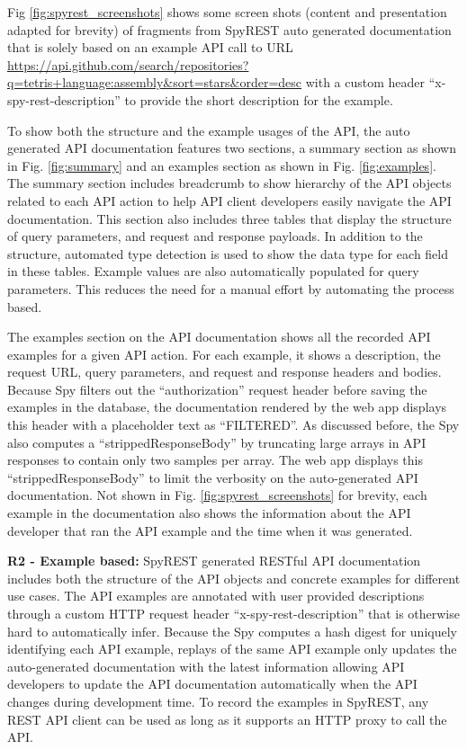 \documentclass[conference]{IEEEtran}
\begin{document}
Fig \ref{fig:spyrest_screenshots} shows some screen shots  (content and presentation adapted for brevity) of fragments from SpyREST auto generated documentation that is solely based on an example API call to URL \url{https://api.github.com/search/repositories?q=tetris+language:assembly&sort=stars&order=desc} with a custom header ``x-spy-rest-description'' to provide the short description for the example.

To show both the structure and the example usages of the API, the auto generated API documentation features two sections, a summary section as shown in Fig. \ref{fig:summary} and an examples section as shown in Fig. \ref{fig:examples}. The summary section includes breadcrumb to show hierarchy of the API objects related to each API action to help API client developers easily navigate the API documentation. This section also includes three tables that display the structure of query parameters, and request and response payloads. In addition to the structure, automated type detection is used to show the data type for each field in these tables. Example values are also automatically populated for query parameters. This reduces the need for a manual effort by automating the process based.

The examples section on the API documentation shows all the recorded API examples for a given API action. For each example, it shows a description, the request URL, query parameters, and request and response headers and bodies. Because Spy filters out the ``authorization'' request header before saving the examples in the database, the documentation rendered by the web app displays this header with a placeholder text as ``FILTERED''. As discussed before, the Spy also computes a ``strippedResponseBody'' by truncating large arrays in API responses to contain only two samples per array. The web app displays this ``strippedResponseBody'' to limit the verbosity on the auto-generated API documentation. Not shown in Fig. \ref{fig:spyrest_screenshots} for brevity, each example in the documentation also shows the information about the API developer that ran the API example and the time when it was generated.

\textbf{R2 - Example based:} SpyREST generated RESTful API documentation includes both the structure of the API objects and concrete examples for different use cases. The API examples are annotated with user provided descriptions through a custom HTTP request header ``x-spy-rest-description'' that is otherwise hard to automatically infer. Because the Spy computes a hash digest for uniquely identifying each API example, replays of the same API example only updates the auto-generated documentation with the latest information allowing API developers to update the API documentation automatically when the API changes during development time. To record the examples in SpyREST, any REST API client can be used as long as it supports an HTTP proxy to call the API.
\end{document}
